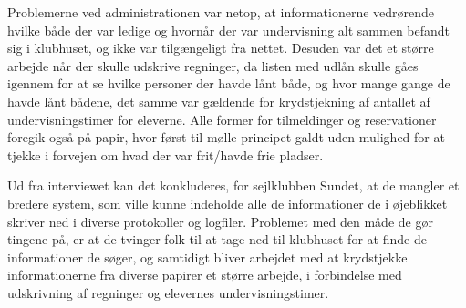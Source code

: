 Problemerne ved administrationen var netop, at informationerne vedrørende hvilke både der var ledige og hvornår der var undervisning alt sammen befandt sig i klubhuset, og ikke var tilgængeligt fra nettet. Desuden var det et større arbejde når der skulle udskrive regninger, da listen med udlån skulle gåes igennem for at se hvilke personer der havde lånt både, og hvor mange gange de havde lånt bådene,  det samme var gældende for krydstjekning af antallet af undervisningstimer for eleverne. Alle former for tilmeldinger og reservationer foregik også på papir, hvor først til mølle principet galdt uden mulighed for at tjekke i forvejen om hvad der var frit/havde frie pladser.

Ud fra interviewet kan det konkluderes, for sejlklubben Sundet, at de mangler et bredere system, som ville kunne indeholde alle de informationer de i øjeblikket skriver ned i diverse protokoller og logfiler. Problemet med den måde de gør tingene på, er at de tvinger folk til at tage ned til klubhuset for at finde de informationer de søger, og samtidigt bliver arbejdet med at krydstjekke informationerne fra diverse papirer et større arbejde, i forbindelse med udskrivning af regninger og elevernes undervisningstimer.  